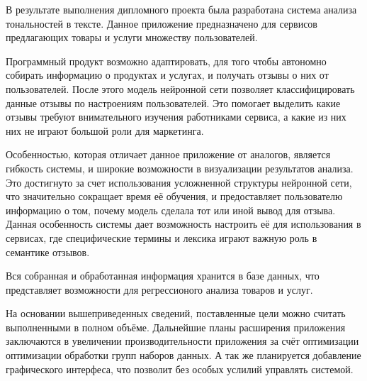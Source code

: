 \label{sec:outro}
В результате выполнения дипломного проекта была разработана система анализа тональностей в тексте. Данное приложение предназначено для сервисов предлагающих товары и услуги множеству пользователей.

Программный продукт возможно адаптировать, для того чтобы автономно собирать информацию о продуктах и услугах, и получать отзывы о них от пользователей. После этого модель нейронной сети позволяет классифицировать данные отзывы по настроениям пользователей. Это помогает выделить какие отзывы требуют внимательного изучения работниками сервиса, а какие из них них не играют большой роли для маркетинга.

Особенностью, которая отличает данное приложение от аналогов, является гибкость системы, и широкие возможности в визуализации результатов анализа. Это достигнуто за счет использования усложненной структуры нейронной сети, что значительно сокращает время её обучения, и предоставляет пользователю информацию о том, почему модель сделала тот или иной вывод для отзыва. Данная особенность системы дает возможность настроить её для использования в сервисах, где специфические термины и лексика играют важную роль в семантике отзывов.

Вся собранная и обработанная информация хранится в базе данных, что представляет возможности для регрессионого анализа товаров и услуг.

На основании вышеприведенных сведений, поставленные цели можно считать выполненными в полном объёме. Дальнейшие планы расширения приложения заключаются в увеличении производительности приложения за счёт оптимизации оптимизации обработки групп наборов данных. А так же планируется добавление графического интерфеса, что позволит без особых услилий управлять системой.
